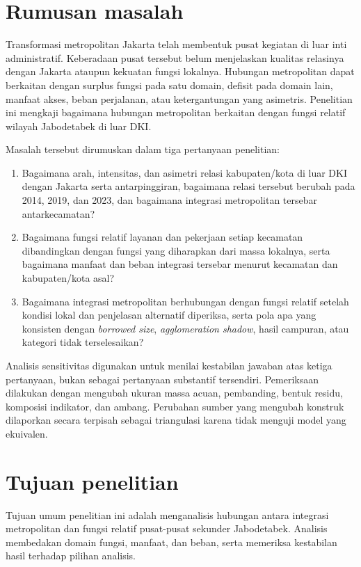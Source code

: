 \documentclass[12pt,a4paper,oneside,openany,indonesian]{report}
\begin{document}
\section{Rumusan masalah}

Transformasi metropolitan Jakarta telah membentuk pusat kegiatan di luar inti administratif. Keberadaan pusat tersebut belum menjelaskan kualitas relasinya dengan Jakarta ataupun kekuatan fungsi lokalnya. Hubungan metropolitan dapat berkaitan dengan surplus fungsi pada satu domain, defisit pada domain lain, manfaat akses, beban perjalanan, atau ketergantungan yang asimetris. Penelitian ini mengkaji bagaimana hubungan metropolitan berkaitan dengan fungsi relatif wilayah Jabodetabek di luar DKI.

Masalah tersebut dirumuskan dalam tiga pertanyaan penelitian:

\begin{enumerate}
  \item Bagaimana arah, intensitas, dan asimetri relasi kabupaten/kota di luar DKI dengan Jakarta serta antarpinggiran, bagaimana relasi tersebut berubah pada 2014, 2019, dan 2023, dan bagaimana integrasi metropolitan tersebar antarkecamatan?
  \item Bagaimana fungsi relatif layanan dan pekerjaan setiap kecamatan dibandingkan dengan fungsi yang diharapkan dari massa lokalnya, serta bagaimana manfaat dan beban integrasi tersebar menurut kecamatan dan kabupaten/kota asal?
  \item Bagaimana integrasi metropolitan berhubungan dengan fungsi relatif setelah kondisi lokal dan penjelasan alternatif diperiksa, serta pola apa yang konsisten dengan \textit{borrowed size}, \textit{agglomeration shadow}, hasil campuran, atau kategori tidak terselesaikan?
\end{enumerate}

Analisis sensitivitas digunakan untuk menilai kestabilan jawaban atas ketiga pertanyaan, bukan sebagai pertanyaan substantif tersendiri. Pemeriksaan dilakukan dengan mengubah ukuran massa acuan, pembanding, bentuk residu, komposisi indikator, dan ambang. Perubahan sumber yang mengubah konstruk dilaporkan secara terpisah sebagai triangulasi karena tidak menguji model yang ekuivalen.

\section{Tujuan penelitian}

Tujuan umum penelitian ini adalah menganalisis hubungan antara integrasi metropolitan dan fungsi relatif pusat-pusat sekunder Jabodetabek. Analisis membedakan domain fungsi, manfaat, dan beban, serta memeriksa kestabilan hasil terhadap pilihan analisis.
\end{document}
